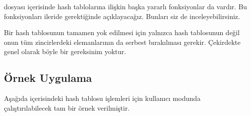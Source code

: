 \documentclass[a4paper,10pt,turkish]{sphinxmanual}
\begin{document}
\begin{sphinxVerbatim}[commandchars=\\\{\}]
\end{sphinxVerbatim}

\sphinxAtStartPar
{} dosyası içerisinde hash tablolarına ilişkin başka yararlı fonksiyonlar da vardır.
Bu fonksiyonları ileride gerektiğinde açıklayacağız. Bunları siz de inceleyebilirsiniz.

\sphinxAtStartPar
Bir hash tablosunun tamamen yok edilmesi için yalnızca hash tablosunun değil onun tüm
zincirlerdeki elemanlarının da serbest bırakılması gerekir. Çekirdekte genel olarak böyle
bir gereksinim yoktur.


\subsection{Örnek Uygulama}
\label{\detokenize{kernellinkedlistandhashtable:ornek-uygulama}}
\sphinxAtStartPar
Aşağıda  içerisindeki hash tablosu işlemleri için kullanıcı modunda
çalıştırılabilecek tam bir örnek verilmiştir.
\end{document}
